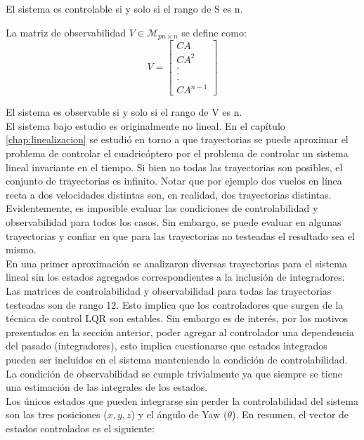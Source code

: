 \documentclass[main]{subfiles}
\begin{document}
El sistema es controlable si y solo si el rango de S es n. 

La matriz de observabilidad $V\in \mathcal{M}_{pn \times n}$ se define como:
\begin{equation}
\label{eq:obs}
V=
\left[
\begin{array}{c}
 CA\\
CA^2\\
.\\
.\\
.\\
CA^{n-1}
\end{array}\right]
\end{equation}

El sistema es observable si y solo si el rango de V es n.\\

El sistema bajo estudio es originalmente no lineal. En el cap\'itulo \ref{chap:linealizacion} se estudi\'o en torno a que trayectorias se puede aproximar el problema de controlar el cuadric\'optero por el problema de controlar un sistema lineal invariante en el tiempo. Si bien no todas las trayectorias son posibles, el conjunto de trayectorias es infinito. Notar que por ejemplo dos vuelos en l\'inea recta a dos velocidades distintas son, en realidad, dos trayectorias distintas. Evidentemente, es imposible evaluar las condiciones de controlabilidad y observabilidad para todos los casos. Sin embargo, se puede evaluar en algunas trayectorias y confiar en que para las trayectorias no testeadas el resultado sea el mismo.\\

En una primer aproximaci\'on se analizaron diversas trayectorias para el sistema lineal sin los estados agregados correspondientes a la inclusi\'on de integradores. Las matrices de controlabilidad y observabilidad para todas las trayectorias testeadas son de rango 12. Esto implica que los controladores que surgen de la t\'ecnica de control LQR son estables. Sin embargo es de inter\'es, por los motivos presentados en la secci\'on anterior, poder agregar al controlador una dependencia del pasado (integradores), esto implica cuestionarse que estados integrados pueden ser incluidos en el sistema manteniendo la condici\'on de controlabilidad. La condici\'on de observabilidad se cumple trivialmente ya que siempre se tiene una estimaci\'on de las integrales de los estados. \\

Los \'unicos estados que pueden integrarse sin perder la controlabilidad del sistema son las tres posiciones ($x,y,z$) y el \'angulo de Yaw ($\theta$). En resumen, el vector de estados controlados es el siguiente:
\end{document}
